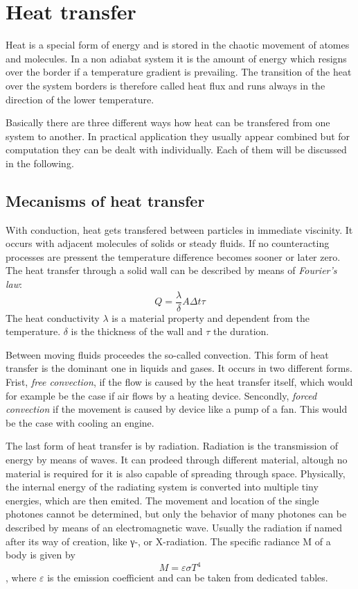 \section{Heat transfer}
Heat is a special form of energy and is stored in the chaotic movement of atomes and molecules. In a non adiabat system it is the amount of energy which resigns over the border if a temperature gradient is prevailing. The transition of the heat over the system borders is therefore called heat flux and runs always in the direction of the lower temperature.

Basically there are three different ways how heat can be transfered from one system to another. In practical application they usually appear combined but for computation they can be dealt with individually. Each of them will be discussed in the following.
\subsection{Mecanisms of heat transfer}
With conduction, heat gets transfered between particles in immediate viscinity. It occurs with adjacent molecules of solids or steady fluids. If no counteracting processes are pressent the temperature difference becomes sooner or later zero. The heat transfer through a solid wall can be described by means of \emph{Fourier's law}:
\begin{equation}
Q = \frac{\lambda}{\delta} A \Delta t \tau
\end{equation}
The heat conductivity $\lambda$ is a material property and dependent from the temperature. $\delta$ is the thickness of the wall and $\tau$ the duration.

Between moving fluids proceedes the so-called convection. This form of heat transfer is the dominant one in liquids and gases. It occurs in two different forms. Frist, \emph{free convection}, if the flow is caused by the heat transfer itself, which would for example be the case if air flows by a heating device. Sencondly, \emph{forced convection} if the movement is caused by device like a pump of a fan. This would be the case with cooling an engine. 

The last form of heat transfer is by radiation. Radiation is the transmission of energy by means of waves. It can prodeed through different material, altough no material is required for it is also capable of spreading through space. Physically, the internal energy of the radiating system is converted into multiple tiny energies, which are then emited. The movement and location of the single photones cannot be determined, but only the behavior of many photones can be described by means of an electromagnetic wave. Usually the radiation if named after its way of creation, like γ-, or X-radiation. 
The specific radiance M of a body is given by
\begin{equation}
M = \varepsilon \sigma T^4
\end{equation},
where $\varepsilon$ is the emission coefficient and can be taken from dedicated tables.
